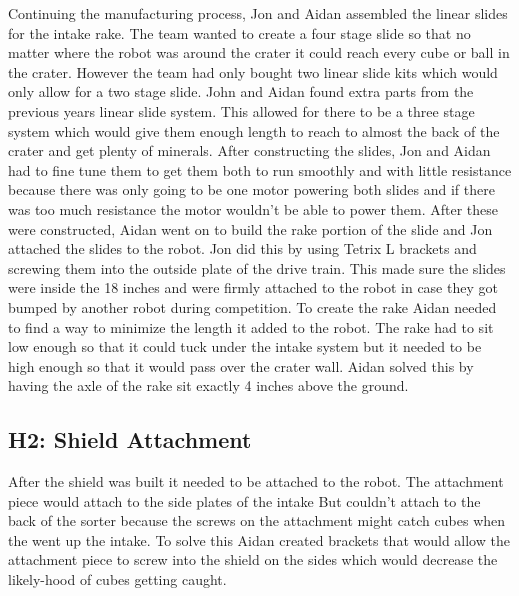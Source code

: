 \documentclass{article}
\begin{document}
Continuing the manufacturing process, Jon and Aidan assembled the linear slides for the intake rake. The team wanted to create a four stage slide so that no matter where the robot was around the crater it could reach every cube or ball in the crater. However the team had only bought two linear slide kits which would only allow for a two stage slide. John and Aidan found extra parts from the previous years linear slide system. This allowed for there to be a three stage system which would give them enough length to reach to almost the back of the crater and get plenty of minerals. After constructing the slides, Jon and Aidan had to fine tune them to get them both to run smoothly and with little resistance because there was only going to be one motor powering both slides and if there was too much resistance the motor wouldn't be able to power them. After these were constructed, Aidan went on to build the rake portion of the slide and Jon attached the slides to the robot. Jon did this by using Tetrix L brackets and screwing them into the outside plate of the drive train. This made sure the slides were inside the 18 inches and were firmly attached to the robot in case they got bumped by another robot during competition. To create the rake Aidan needed to find a way to minimize the length it added to the robot. The rake had to sit low enough so that it could tuck under the intake system but it needed to be high enough so that it would pass over the crater wall. Aidan solved this by having the axle of the rake sit exactly 4 inches above the ground.

\subsection{H2: Shield Attachment}

After the shield was built it needed to be attached to the robot. The attachment piece would attach to the side plates of the intake But couldn't attach to the back of the sorter because the screws on the attachment might catch cubes when the went up the intake. To solve this Aidan created brackets that would allow the attachment piece to screw into the shield on the sides which would decrease the likely-hood of cubes getting caught.
\end{document}
